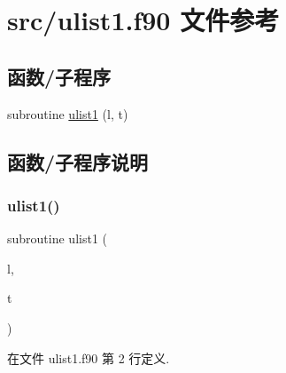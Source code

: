 \hypertarget{ulist1_8f90}{}\section{src/ulist1.f90 文件参考}
\label{ulist1_8f90}
\subsection*{函数/子程序}
\begin{DoxyCompactItemize}
\item 
subroutine \mbox{\hyperlink{ulist1_8f90_a7f104d0b9a48b9e216c87766158b5e5e}{ulist1}} (l, t)
\end{DoxyCompactItemize}


\subsection{函数/子程序说明}
\mbox{\label{ulist1_8f90_a7f104d0b9a48b9e216c87766158b5e5e}} 
\subsubsection{\texorpdfstring{ulist1()}{ulist1()}}
{\footnotesize\ttfamily subroutine ulist1 (\begin{DoxyParamCaption}\item[{}]{l,  }\item[{}]{t }\end{DoxyParamCaption})}



在文件 ulist1.\+f90 第 2 行定义.


